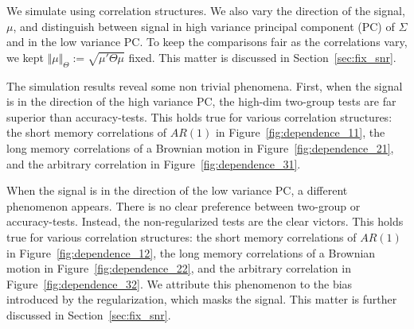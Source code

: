 \documentclass[]{bio}
\begin{document}
We simulate using correlation structures.
We also vary the direction of the signal, $\mu$, and distinguish between signal in high variance principal component (PC) of $\Sigma$ and in the low variance PC. 
To keep the comparisons fair as the correlations vary, we kept $\Vert \mu \Vert_\Theta:=\sqrt{\mu'\Theta\mu}$ fixed.
This matter is discussed in Section~\ref{sec:fix_snr}.


The simulation results reveal some non trivial phenomena.
First, when the signal is in the direction of the high variance PC, the high-dim two-group tests are far superior than accuracy-tests. 
This holds true for various correlation structures: the short memory correlations of $AR(1)$ in Figure~\ref{fig:dependence_11}, the long memory correlations of a Brownian motion in Figure~\ref{fig:dependence_21}, and the arbitrary correlation in Figure~\ref{fig:dependence_31}.

When the signal is in the direction of the low variance PC, a different phenomenon appears.
There is no clear preference between two-group or accuracy-tests.
Instead, the non-regularized tests are the clear victors. 
This holds true for various correlation structures: the short memory correlations of $AR(1)$ in Figure~\ref{fig:dependence_12}, the long memory correlations of a Brownian motion in Figure~\ref{fig:dependence_22}, and the arbitrary correlation in Figure~\ref{fig:dependence_32}.
We attribute this phenomenon to the bias introduced by the regularization, which masks the signal.
This matter is further discussed in Section~\ref{sec:fix_snr}.
\end{document}
